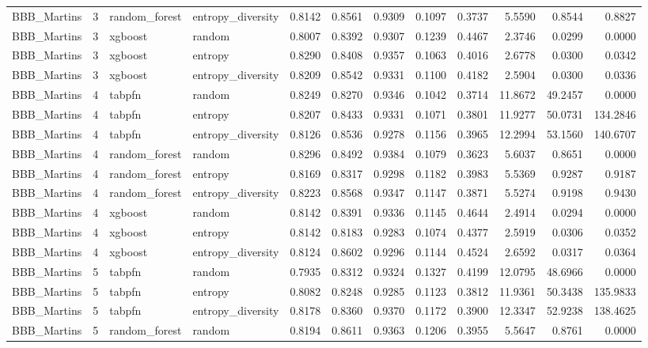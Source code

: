 \begin{tabular}{lrllrrrrrrrr}
BBB_Martins & 3 & random_forest & entropy_diversity & 0.8142 & 0.8561 & 0.9309 & 0.1097 & 0.3737 & 5.5590 & 0.8544 & 0.8827 \\
BBB_Martins & 3 & xgboost & random & 0.8007 & 0.8392 & 0.9307 & 0.1239 & 0.4467 & 2.3746 & 0.0299 & 0.0000 \\
BBB_Martins & 3 & xgboost & entropy & 0.8290 & 0.8408 & 0.9357 & 0.1063 & 0.4016 & 2.6778 & 0.0300 & 0.0342 \\
BBB_Martins & 3 & xgboost & entropy_diversity & 0.8209 & 0.8542 & 0.9331 & 0.1100 & 0.4182 & 2.5904 & 0.0300 & 0.0336 \\
BBB_Martins & 4 & tabpfn & random & 0.8249 & 0.8270 & 0.9346 & 0.1042 & 0.3714 & 11.8672 & 49.2457 & 0.0000 \\
BBB_Martins & 4 & tabpfn & entropy & 0.8207 & 0.8433 & 0.9331 & 0.1071 & 0.3801 & 11.9277 & 50.0731 & 134.2846 \\
BBB_Martins & 4 & tabpfn & entropy_diversity & 0.8126 & 0.8536 & 0.9278 & 0.1156 & 0.3965 & 12.2994 & 53.1560 & 140.6707 \\
BBB_Martins & 4 & random_forest & random & 0.8296 & 0.8492 & 0.9384 & 0.1079 & 0.3623 & 5.6037 & 0.8651 & 0.0000 \\
BBB_Martins & 4 & random_forest & entropy & 0.8169 & 0.8317 & 0.9298 & 0.1182 & 0.3983 & 5.5369 & 0.9287 & 0.9187 \\
BBB_Martins & 4 & random_forest & entropy_diversity & 0.8223 & 0.8568 & 0.9347 & 0.1147 & 0.3871 & 5.5274 & 0.9198 & 0.9430 \\
BBB_Martins & 4 & xgboost & random & 0.8142 & 0.8391 & 0.9336 & 0.1145 & 0.4644 & 2.4914 & 0.0294 & 0.0000 \\
BBB_Martins & 4 & xgboost & entropy & 0.8142 & 0.8183 & 0.9283 & 0.1074 & 0.4377 & 2.5919 & 0.0306 & 0.0352 \\
BBB_Martins & 4 & xgboost & entropy_diversity & 0.8124 & 0.8602 & 0.9296 & 0.1144 & 0.4524 & 2.6592 & 0.0317 & 0.0364 \\
BBB_Martins & 5 & tabpfn & random & 0.7935 & 0.8312 & 0.9324 & 0.1327 & 0.4199 & 12.0795 & 48.6966 & 0.0000 \\
BBB_Martins & 5 & tabpfn & entropy & 0.8082 & 0.8248 & 0.9285 & 0.1123 & 0.3812 & 11.9361 & 50.3438 & 135.9833 \\
BBB_Martins & 5 & tabpfn & entropy_diversity & 0.8178 & 0.8360 & 0.9370 & 0.1172 & 0.3900 & 12.3347 & 52.9238 & 138.4625 \\
BBB_Martins & 5 & random_forest & random & 0.8194 & 0.8611 & 0.9363 & 0.1206 & 0.3955 & 5.5647 & 0.8761 & 0.0000 \\

\end{tabular}
